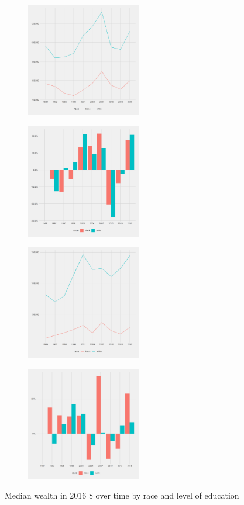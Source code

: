 \documentclass[]{scrartcl}
\begin{document}
\begin{figure}[h]
	\centering
	\begin{subfigure}{.49\textwidth}
		\centering
		\includegraphics[width=\linewidth, height=5cm]{../median hwealth finance_survey_bw_25 _by race .png}
	\end{subfigure}
	\begin{subfigure}{.49\textwidth}
		\centering
		\includegraphics[width=\linewidth, height=5cm]{../change_median hwealth finance_survey_bw_25 _by race .png}
	\end{subfigure}
	\begin{subfigure}{.49\textwidth}
		\centering
		\includegraphics[width=\linewidth, height=5cm]{../median non_hwealth finance_survey_bw_25 _by race .png}
	\end{subfigure}
	\begin{subfigure}{.49\textwidth}
		\centering
		\includegraphics[width=\linewidth, height=5cm]{../change_median non_hwealth finance_survey_bw_25 _by race .png}
	\end{subfigure}
	\caption{Median wealth in 2016 \$ over time by race and level of education}\label{fig:bw25_htrends}
\end{figure}
\end{document}
